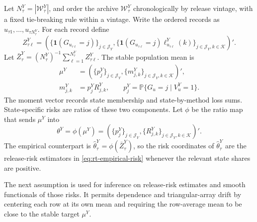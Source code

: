 \documentclass[a4paper, 12pt]{article}
\theoremstyle{plain}
\theoremstyle{remark}
\newcommand{\Prb}{\mathbb{P}}
\newcommand{\Kcal}{\mathcal{K}}
\newcommand{\1}{\mathbf{1}}
\begin{document}
Let \(N^Y_\tau=|\mathcal W^Y_\tau|\), and order the archive \(\mathcal W^Y_\tau\) chronologically by release vintage, with a fixed tie-breaking rule within a vintage. Write the ordered records as \(u_{\tau1},\ldots,u_{\tau N^Y_\tau}\). For each record define
\begin{equation*}
    Z^Y_{\tau\ell}
    =
    \left(
        \{\1(G_{u_{\tau\ell}}=j)\}_{j\in\mathcal J_Y},
        \{\1(G_{u_{\tau\ell}}=j)\ell^Y_{u_{\tau\ell}}(k)\}_{j\in\mathcal J_Y,k\in\Kcal}
    \right)' .
\end{equation*}
Let \(\bar Z^Y_\tau=(N^Y_\tau)^{-1}\sum_{\ell=1}^{N^Y_\tau}Z^Y_{\tau\ell}\). The stable population mean is
\begin{equation*}
\begin{aligned}
    \mu^Y
    &=
    \left(
        \{p^Y_j\}_{j\in\mathcal J_Y},
        \{m^Y_{j,k}\}_{j\in\mathcal J_Y,k\in\Kcal}
    \right)' ,
    \\
    m^Y_{j,k}&=p^Y_jR^Y_{j,k},
    \qquad
    p^Y_j=\Prb\{G_u=j\mid V^Y_u=1\} .
\end{aligned}
\end{equation*}
The moment vector records state membership and state-by-method loss sums. State-specific risks are ratios of these two components. Let \(\phi\) be the ratio map that sends \(\mu^Y\) into
\begin{equation*}
    \theta^Y
    =
    \phi(\mu^Y)
    =
    \left(
        \{p^Y_j\}_{j\in\mathcal J_Y},
        \{R^Y_{j,k}\}_{j\in\mathcal J_Y,k\in\Kcal}
    \right)' .
\end{equation*}
The empirical counterpart is \(\widehat\theta^Y_\tau=\phi(\bar Z^Y_\tau)\), so the risk coordinates of \(\widehat\theta^Y_\tau\) are the release-risk estimators in \eqref{eq:rt-empirical-risk} whenever the relevant state shares are positive.

The next assumption is used for inference on release-risk estimates and smooth functionals of those risks. It permits dependence and triangular-array drift by centering each row at its own mean and requiring the row-average mean to be close to the stable target \(\mu^Y\).
\end{document}
